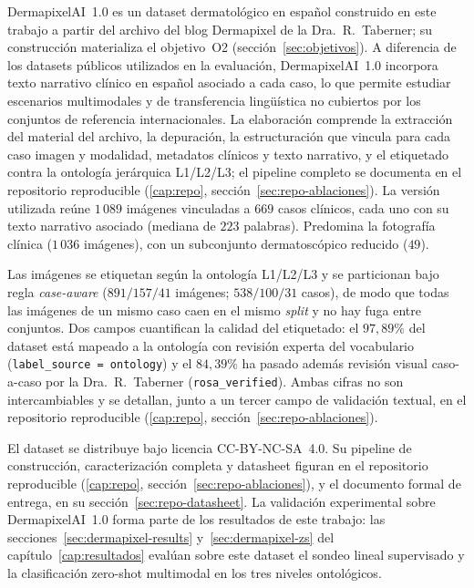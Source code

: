 DermapixelAI~1.0 es un dataset dermatológico en español construido
en este trabajo a partir del archivo del blog Dermapixel de la
Dra.~R.~Taberner; su construcción materializa el objetivo~O2
(sección~\ref{sec:objetivos}). A diferencia de los datasets públicos
utilizados en la evaluación, DermapixelAI~1.0 incorpora texto
narrativo clínico en español asociado a cada caso, lo que permite
estudiar escenarios multimodales y de transferencia lingüística no
cubiertos por los conjuntos de referencia internacionales. La
elaboración comprende la
extracción del material del archivo, la depuración, la
estructuración que vincula para cada caso imagen y modalidad,
metadatos clínicos y texto narrativo, y el etiquetado contra la
ontología jerárquica L1/L2/L3; el pipeline completo se documenta en
el repositorio reproducible (\ref{cap:repo}, sección~\ref{sec:repo-ablaciones}). La versión utilizada reúne $1\,089$
imágenes vinculadas a $669$ casos clínicos, cada uno con su texto
narrativo asociado (mediana de $223$ palabras). Predomina la
fotografía clínica ($1\,036$ imágenes), con un subconjunto
dermatoscópico reducido ($49$).

Las imágenes se etiquetan según la ontología L1/L2/L3 y se
particionan bajo regla \emph{case-aware} ($891 / 157 / 41$
imágenes; $538 / 100 / 31$ casos), de modo que todas las imágenes
de un mismo caso caen en el mismo \emph{split} y no hay fuga entre
conjuntos. Dos campos cuantifican la calidad del etiquetado: el
$97{,}89\%$ del dataset está mapeado a la ontología con revisión
experta del vocabulario (\texttt{label\_source = ontology}) y el
$84{,}39\%$ ha pasado además revisión visual caso-a-caso por la
Dra.~R.~Taberner (\texttt{rosa\_verified}). Ambas cifras no son
intercambiables y se detallan, junto a un tercer campo de validación
textual, en el repositorio reproducible (\ref{cap:repo}, sección~\ref{sec:repo-ablaciones}).

El dataset se distribuye bajo licencia CC-BY-NC-SA~4.0. Su pipeline
de construcción, caracterización completa y datasheet figuran en el
repositorio reproducible (\ref{cap:repo}, sección~\ref{sec:repo-ablaciones}), y el documento formal de entrega, en su
sección~\ref{sec:repo-datasheet}. La validación experimental sobre
DermapixelAI~1.0 forma parte de los resultados de este trabajo: las
secciones~\ref{sec:dermapixel-results} y~\ref{sec:dermapixel-zs} del
capítulo~\ref{cap:resultados} evalúan sobre este dataset el sondeo
lineal supervisado y la clasificación zero-shot multimodal en los
tres niveles ontológicos.

